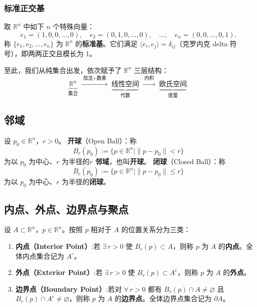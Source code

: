 \documentclass[lang=cn,11pt]{elegantbook}
\begin{document}
\subsubsection{标准正交基}

\begin{definition} \label{def:standard-basis}
取 $\mathbb R^n$ 中如下 $n$ 个特殊向量：
\[
e_1=(1,0,0,\dots,0),\quad e_2=(0,1,0,\dots,0),\quad\dots,\quad e_n=(0,0,\dots,0,1).
\]
称 $\{e_1,e_2,\dots,e_n\}$ 为 $\mathbb R^n$ 的\textbf{标准基}。它们满足 $\langle e_i,e_j\rangle=\delta_{ij}$（克罗内克 delta 符号），即两两正交且模长为 1。
\end{definition}

至此，我们从纯集合出发，依次赋予了 $\mathbb R^n$ 三层结构：
\[
\underbrace{\mathbb R^n}_{\text{集合}} \;\xrightarrow{\;\text{加法}+\text{数乘}\;}\; \underbrace{\text{线性空间}}_{\text{代数}} \;\xrightarrow{\;\text{内积}\;}\; \underbrace{\text{欧氏空间}}_{\text{度量}}.
\]


\subsection{邻域}

\begin{definition} \label{def:neighborhood}
设 $p_0\in\mathbb R^n$，$r>0$。
\textbf{开球}（Open Ball）：称
\[
B_r(p_0):=\bigl\{p\in\mathbb R^n\mid\|p-p_0\|<r\bigr\}
\]
为以 $p_0$ 为中心、$r$ 为半径的\textbf{$r$ 邻域}，也叫\textbf{开球}。
\textbf{闭球}（Closed Ball）：称
\[
\overline{B}_r(p_0):=\bigl\{p\in\mathbb R^n\mid\|p-p_0\|\leqslant  r\bigr\}
\]
为以 $p_0$ 为中心、$r$ 为半径的\textbf{闭球}。
\end{definition}


\subsection{内点、外点、边界点与聚点}

\begin{definition}[内点、外点与边界点] \label{def:interior-point}
设 $A\subset\mathbb R^n$，$p\in\mathbb R^n$。按照 $p$ 相对于 $A$ 的位置关系分为三类：
\begin{enumerate}
  \item\textbf{内点（Interior Point）}:若 $\exists\,r>0$ 使 $B_r(p)\subset A$，则称 $p$ 为 $A$ 的\textbf{内点}。全体内点集合记为 $A^\circ$。
  \item\textbf{外点（Exterior Point）}:若 $\exists\,r>0$ 使 $B_r(p)\subset A^c$，则称 $p$ 为 $A$ 的\textbf{外点}。
  \item\textbf{边界点（Boundary Point）}:若对 $\forall\,r>0$ 都有 $B_r(p)\cap A\neq\varnothing$ 且 $B_r(p)\cap A^c\neq\varnothing$，则称 $p$ 为 $A$ 的\textbf{边界点}。全体边界点集合记为 $\partial A$。
\end{enumerate}
\end{definition}
\end{document}
